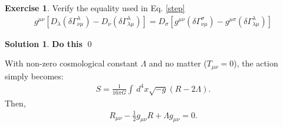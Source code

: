 \documentclass{book}
\numberwithin{equation}{section}
\theoremstyle{definition}
\newtheorem{exmp}{Exercise}[section]
\newtheorem{sln}{Solution}[section]
\newcommand{\f}[2]{\frac{#1}{#2}}
\newcommand{\lb}{\left[}
\newcommand{\rb}{\right]}
\begin{document}
\begin{exmp}\label{exxer}
	Verify the equality used in Eq. \eqref{step}
	\begin{align}
	g^{\mu\nu} \lb D_\lambda (\delta \Gamma^\lambda_{\nu\mu}) - D_\nu (\delta \Gamma^\lambda_{\lambda\mu})\rb
	=
	D_\sigma \lb g^{\mu\nu} (\delta \Gamma^\sigma_{\nu\mu}) - g^{\mu\sigma} (\delta \Gamma^\lambda_{\lambda\mu})  \rb
	\end{align}
	
	\begin{sln}
		\textbf{Do this} \qed\\
	\end{sln}
\end{exmp}














With non-zero cosmological constant $\Lambda$ and no matter ($T_{\mu\nu} = 0$), the action simply becomes:
\begin{align}
S = \f{1}{16\pi G}\int \,d^4x \sqrt{-g}(R - 2\Lambda).
\end{align}
Then,
\begin{align}\label{ricci}
R_{\mu\nu} - \f{1}{2}g_{\mu\nu}R + \Lambda g_{\mu\nu} = 0.
\end{align}
\end{document}
